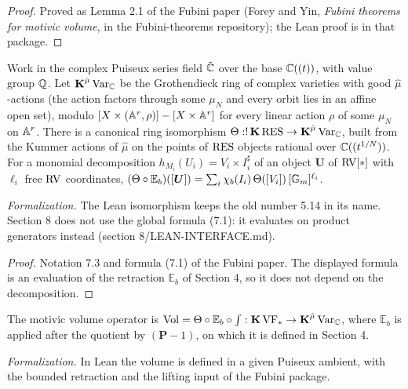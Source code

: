 \begin{proof}
\leanok
Proved as Lemma 2.1 of the Fubini paper (Forey and Yin, \emph{Fubini theorems for motivic volume}, in the Fubini-theorems repository); the Lean proof is in that package.
\end{proof}

\setcounter{theorem}{1}
\begin{imported}
\label{bipo-gdv}
\leanok
{}
Work in the complex Puiseux series field $\tilde{\mathbb{C}}$ over the base $\mathbb{C}((t))$, with value group $\mathbb{Q}$. Let $\operatorname{\mathbf{K}}^{\hat\mu}\mathrm{Var}_{\mathbb{C}}$ be the Grothendieck ring of complex varieties with good $\hat\mu$-actions (the action factors through some $\mu_N$ and every orbit lies in an affine open set), modulo $[X \times (\mathbb{A}^r, \rho)] - [X \times \mathbb{A}^r]$ for every linear action $\rho$ of some $\mu_N$ on $\mathbb{A}^r$. There is a canonical ring isomorphism $\Theta : !\operatorname{\mathbf{K}}\mathrm{RES} \to \operatorname{\mathbf{K}}^{\hat\mu}\mathrm{Var}_{\mathbb{C}}$, built from the Kummer actions of $\hat\mu$ on the points of $\mathrm{RES}$ objects rational over $\mathbb{C}((t^{1/N}))$. For a monomial decomposition $h_{M_i}(U_i) = V_i \times I_i^\sharp$ of an object $\bm U$ of $\mathrm{RV}[*]$ with $\ell_i$ free $\mathrm{RV}$ coordinates, $(\Theta \circ \mathbb{E}_b)([\boldsymbol{U}]) = \sum_i \chi_b(I_i)\, \Theta([V_i])\, [\mathbb{G}_m]^{\ell_i}$.

\emph{Formalization.} The Lean isomorphism keeps the old number 5.14 in its name. Section 8 does not use the global formula (7.1): it evaluates on product generators instead (section 8/LEAN-INTERFACE.md).
\end{imported}

\begin{proof}
\leanok
Notation 7.3 and formula (7.1) of the Fubini paper. The displayed formula is an evaluation of the retraction $\mathbb{E}_b$ of Section 4, so it does not depend on the decomposition.
\end{proof}

\setcounter{theorem}{2}
\begin{imported}
\label{mov-vol}
\leanok
{}
The motivic volume operator is $\operatorname{Vol} = \Theta \circ \mathbb{E}_b \circ \int : \operatorname{\mathbf{K}}\mathrm{VF}_* \to \operatorname{\mathbf{K}}^{\hat\mu}\mathrm{Var}_{\mathbb{C}}$, where $\mathbb{E}_b$ is applied after the quotient by $(\bm P - 1)$, on which it is defined in Section 4.

\emph{Formalization.} In Lean the volume is defined in a given Puiseux ambient, with the bounded retraction and the lifting input of the Fubini package.
\end{imported}

